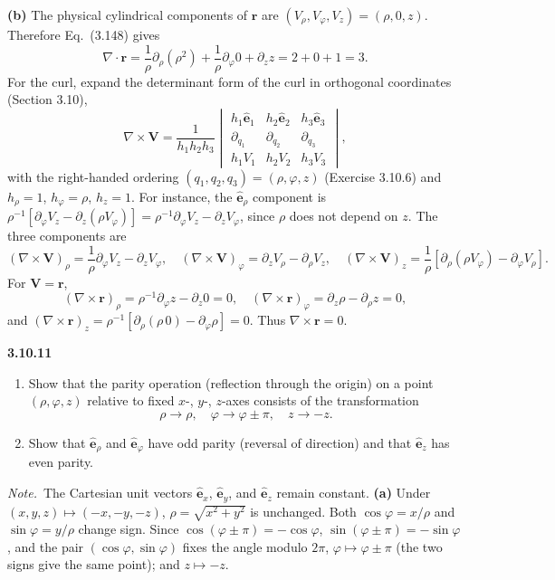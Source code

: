 \textbf{(b)} The physical cylindrical components of $\mathbf r$ are
$(V_\rho,V_\varphi,V_z)=(\rho,0,z)$.
Therefore Eq.~(3.148) gives
\[
\nabla\cdot\mathbf r=\frac1\rho\partial_\rho(\rho^2)
+\frac1\rho\partial_\varphi0+\partial_zz=2+0+1=3.
\]
For the curl, expand the determinant form of the curl in orthogonal
coordinates (Section 3.10),
\[
\nabla\times\mathbf V=\frac1{h_1h_2h_3}
\begin{vmatrix}
h_1\hat{\mathbf e}_1&h_2\hat{\mathbf e}_2&h_3\hat{\mathbf e}_3\\
\partial_{q_1}&\partial_{q_2}&\partial_{q_3}\\
h_1V_1&h_2V_2&h_3V_3
\end{vmatrix},
\]
with the right-handed ordering $(q_1,q_2,q_3)=(\rho,\varphi,z)$
(Exercise 3.10.6) and $h_\rho=1$, $h_\varphi=\rho$, $h_z=1$.
For instance, the $\hat{\mathbf e}_\rho$ component is
$\rho^{-1}[\partial_\varphi V_z-\partial_z(\rho V_\varphi)]
=\rho^{-1}\partial_\varphi V_z-\partial_zV_\varphi$, since $\rho$ does
not depend on $z$. The three components are
\[
(\nabla\times\mathbf V)_\rho=\frac1\rho\partial_\varphi V_z-\partial_zV_\varphi,\quad
(\nabla\times\mathbf V)_\varphi=\partial_zV_\rho-\partial_\rho V_z,\quad
(\nabla\times\mathbf V)_z=\frac1\rho[\partial_\rho(\rho V_\varphi)-\partial_\varphi V_\rho].
\]
For $\mathbf V=\mathbf r$,
\[
(\nabla\times\mathbf r)_\rho=\rho^{-1}\partial_\varphi z-\partial_z0=0,
\quad
(\nabla\times\mathbf r)_\varphi=\partial_z\rho-\partial_\rho z=0,
\]
and
$(\nabla\times\mathbf r)_z=\rho^{-1}[\partial_\rho(\rho\,0)-\partial_\varphi\rho]=0$.
Thus $\boxed{\nabla\times\mathbf r=0}$.

\par\bigskip
\noindent\textbf{3.10.11}\quad
\begin{enumerate}
\item[(a)] Show that the parity operation (reflection through the origin) on a
  point $(\rho,\varphi,z)$ relative to fixed $x$-, $y$-, $z$-axes consists of
  the transformation
  \[
  \rho\to\rho,\quad\varphi\to\varphi\pm\pi,\quad z\to-z.
  \]
\item[(b)] Show that $\hat{\mathbf{e}}_{\rho}$ and $\hat{\mathbf{e}}_{\varphi}$
  have odd parity (reversal of direction) and that $\hat{\mathbf{e}}_{z}$ has
  even parity.
\end{enumerate}
\emph{Note.}~The Cartesian unit vectors $\hat{\mathbf{e}}_{x}$,
$\hat{\mathbf{e}}_{y}$, and $\hat{\mathbf{e}}_{z}$ remain constant.
\solution
\textbf{(a)} Under $(x,y,z)\mapsto(-x,-y,-z)$,
$\rho=\sqrt{x^2+y^2}$ is unchanged. Both $\cos\varphi=x/\rho$
and $\sin\varphi=y/\rho$ change sign. Since
$\cos(\varphi\pm\pi)=-\cos\varphi$, $\sin(\varphi\pm\pi)=-\sin\varphi$,
and the pair $(\cos\varphi,\sin\varphi)$ fixes the angle modulo $2\pi$,
$\varphi\mapsto\varphi\pm\pi$ (the two signs give the same point);
and $z\mapsto-z$.

